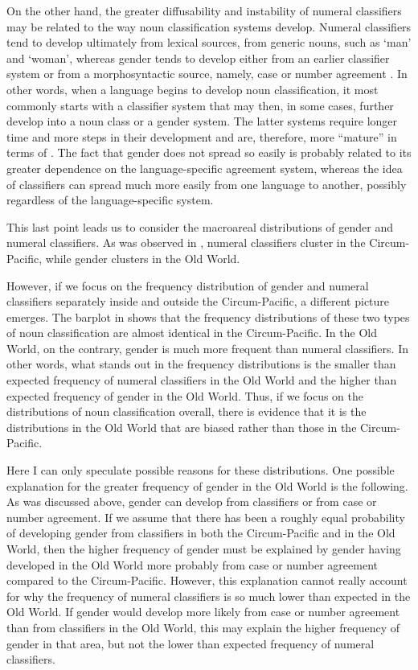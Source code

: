 \documentclass[output=collectionpaper]{langsci/langscibook}
\begin{document}
On the other hand, the greater diffusability and instability of numeral classifiers may be related to the way noun classification systems develop. Numeral classifiers tend to develop ultimately from lexical sources, from generic nouns, such as `man' and `woman', whereas gender tends to develop either from an earlier classifier system or from a morphosyntactic source, namely, case or number agreement \citep{Luraghi2011}. In other words, when a language begins to develop noun classification, it most commonly starts with a classifier system that may then, in some cases, further develop into a noun class or a gender system. The latter systems require longer time and more steps in their development and are, therefore, more ``mature'' in terms of \citet{Dahl2004}. The fact that gender does not spread so easily is probably related to its greater dependence on the language-specific agreement system, whereas the idea of classifiers can spread much more easily from one language to another, possibly regardless of the language-specific system.

This last point leads us to consider the macroareal distributions of gender and numeral classifiers. As was observed in , numeral classifiers cluster in the Circum-Pacific, while gender clusters in the Old World.

However, if we focus on the frequency distribution of gender and numeral classifiers separately inside and outside the Circum-Pacific, a different picture emerges. The barplot in  shows that the frequency distributions of these two types of noun classification are almost identical in the Circum-Pacific. In the Old World, on the contrary, gender is much more frequent than numeral classifiers. In other words, what stands out in the frequency distributions is the smaller than expected frequency of numeral classifiers in the Old World and the higher than expected frequency of gender in the Old World. Thus, if we focus on the distributions of noun classification overall, there is evidence that it is the distributions in the Old World that are biased rather than those in the Circum-Pacific.

Here I can only speculate possible reasons for these distributions. One possible explanation for the greater frequency of gender in the Old World is the following. As was discussed above, gender can develop from classifiers or from case or number agreement. If we assume that there has been a roughly equal probability of developing gender from classifiers in both the Circum-Pacific and in the Old World, then the higher frequency of gender must be explained by gender having developed in the Old World more probably from case or number agreement compared to the Circum-Pacific. However, this explanation cannot really account for why the frequency of numeral classifiers is so much lower than expected in the Old World. If gender would develop more likely from case or number agreement than from classifiers in the Old World, this may explain the higher frequency of gender in that area, but not the lower than expected frequency of numeral classifiers.
\end{document}
